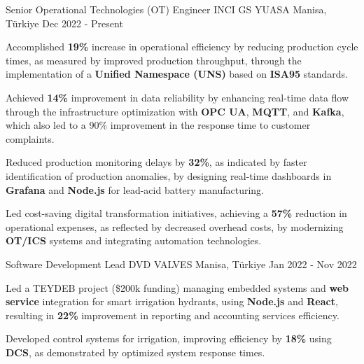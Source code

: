 

\begin{cventries}

  \cventry
    {Senior Operational Technologies (OT) Engineer} %
    {INCI GS YUASA} %
    {Manisa, Türkiye} %
    {Dec 2022 - Present} %
    {
      \begin{cvitems} %
        \item {Accomplished \textbf{19\%} increase in operational efficiency by reducing production cycle times, as measured by improved production throughput, through the implementation of a \textbf{Unified Namespace (UNS)} based on \textbf{ISA95} standards.}
        \item {Achieved \textbf{14\%} improvement in data reliability by enhancing real-time data flow through the infrastructure optimization with \textbf{OPC UA}, \textbf{MQTT}, and \textbf{Kafka}, which also led to a 90\% improvement in the response time to customer complaints.}
        \item {Reduced production monitoring delays by \textbf{32\%}, as indicated by faster identification of production anomalies, by designing real-time dashboards in \textbf{Grafana} and \textbf{Node.js} for lead-acid battery manufacturing.}
        \item {Led cost-saving digital transformation initiatives, achieving a \textbf{57\%} reduction in operational expenses, as reflected by decreased overhead costs, by modernizing \textbf{OT/ICS} systems and integrating automation technologies.}
      \end{cvitems}
    }

  \cventry
    {Software Development Lead} %
    {DVD VALVES} %
    {Manisa, Türkiye} %
    {Jan 2022 - Nov 2022} %
    {
      \begin{cvitems} %
        \item {Led a TEYDEB project (\$200k funding) managing embedded systems and \textbf{web service} integration for smart irrigation hydrants, using \textbf{Node.js} and \textbf{React}, resulting in \textbf{22\%} improvement  in reporting and accounting services efficiency.}
        \item {Developed control systems for irrigation, improving efficiency by \textbf{18\%} using \textbf{DCS}, as demonstrated by optimized system response times.}
      \end{cvitems}
    }


\end{cventries}
